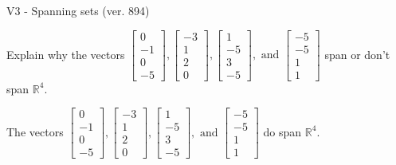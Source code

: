 \begin{exercise}
  \begin{exerciseTitle}V3 - Spanning sets (ver. 894)\end{exerciseTitle}
  \begin{exerciseStatement}
    Explain why the vectors \(\left[\begin{array}{r}
0 \\
-1 \\
0 \\
-5
\end{array}\right] , \left[\begin{array}{r}
-3 \\
1 \\
2 \\
0
\end{array}\right] , \left[\begin{array}{r}
1 \\
-5 \\
3 \\
-5
\end{array}\right] , \text{ and } \left[\begin{array}{r}
-5 \\
-5 \\
1 \\
1
\end{array}\right]\) span or don't span \(\mathbb{R}^4\). 
	


  \end{exerciseStatement}
  \begin{exerciseAnswer}
   The vectors \(\left[\begin{array}{r}
0 \\
-1 \\
0 \\
-5
\end{array}\right] , \left[\begin{array}{r}
-3 \\
1 \\
2 \\
0
\end{array}\right] , \left[\begin{array}{r}
1 \\
-5 \\
3 \\
-5
\end{array}\right] , \text{ and } \left[\begin{array}{r}
-5 \\
-5 \\
1 \\
1
\end{array}\right]\) 
  	 do  
	span \(\mathbb{R}^4\).
  


  \end{exerciseAnswer}
\end{exercise}
